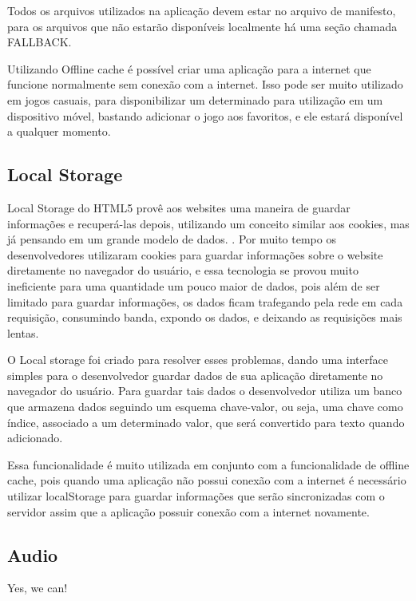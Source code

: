 Todos os arquivos utilizados na aplicação devem estar no arquivo de
manifesto, para os arquivos que não estarão disponíveis localmente há
uma seção chamada FALLBACK.

Utilizando Offline cache é possível criar uma aplicação para a
internet que funcione normalmente sem conexão com a internet. Isso
pode ser muito utilizado em jogos casuais, para disponibilizar um
determinado para utilização em um dispositivo móvel, bastando
adicionar o jogo aos favoritos, e ele estará disponível a qualquer
momento.



\subsection{Local Storage}

Local Storage do HTML5 provê aos websites uma maneira de guardar
informações e recuperá-las depois, utilizando um conceito similar aos
cookies, mas já pensando em um grande modelo de dados. \cite{pilgrim2010html5}.
Por muito tempo os desenvolvedores utilizaram cookies para guardar
informações sobre o website diretamente no navegador do usuário, e
essa tecnologia se provou muito ineficiente para uma quantidade um
pouco maior de dados, pois além de ser limitado para guardar informações,
os dados ficam trafegando pela rede em cada requisição, consumindo
banda, expondo os dados, e deixando as requisições mais lentas.

O Local storage foi criado para resolver esses problemas, dando uma
interface simples para o desenvolvedor guardar dados de sua
aplicação diretamente no navegador do usuário. Para guardar tais dados
o desenvolvedor utiliza um banco que armazena dados seguindo um
esquema chave-valor, ou seja, uma chave como índice, associado a um
determinado valor, que será convertido para texto quando adicionado.

Essa funcionalidade é muito utilizada em conjunto com a funcionalidade
de offline cache, pois quando uma aplicação não possui conexão com a
internet é necessário utilizar localStorage para guardar informações
que serão sincronizadas com o servidor assim que a aplicação possuir
conexão com a internet novamente.

\subsection{Audio}
Yes, we can!

